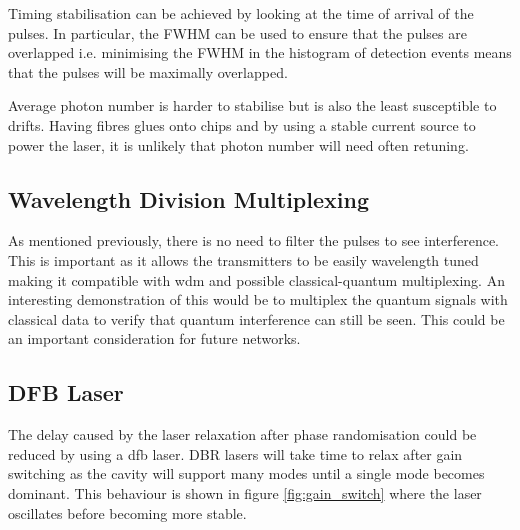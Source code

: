 Timing stabilisation can be achieved by looking at the time of arrival of the pulses. In particular, the \ac{FWHM} can be used to ensure that the pulses are overlapped i.e. minimising the \ac{FWHM} in the histogram of detection events means that the pulses will be maximally overlapped.

Average photon number is harder to stabilise but is also the least susceptible to drifts. Having fibres glues onto chips and by using a stable current source to power the laser, it is unlikely that photon number will need often retuning.

\subsection{Wavelength Division Multiplexing}

As mentioned previously, there is no need to filter the pulses to see interference. This is important as it allows the transmitters to be easily wavelength tuned making it compatible with \ac{wdm} and possible classical-quantum multiplexing. An interesting demonstration of this would be to multiplex the quantum signals with classical data to verify that quantum interference can still be seen. This could be an important consideration for future networks.

\subsection{DFB Laser}

The delay caused by the laser relaxation after phase randomisation could be reduced by using a \ac{dfb} laser. \ac{DBR} lasers will take time to relax after gain switching as the cavity will support many modes until a single mode becomes dominant. This behaviour is shown in figure \ref{fig:gain_switch} where the laser oscillates before becoming more stable. 

